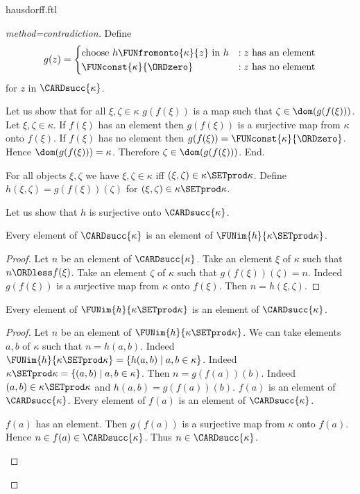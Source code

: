 \documentclass{article}
\begin{document}
\begin{smodule}{hausdorff.ftl}
\begin{forthel}
\begin{proof}[method=contradiction]
    Define \[ g(z) =
      \begin{cases}
        \text{choose $h \FUNfromonto{\kappa}{z}$ in $h$}
        & : \text{$z$ has an element}
        \\
        \text{$\FUNconst{\kappa}{\ORDzero}$}
        & : \text{$z$ has no element}
      \end{cases}
    \] for $z$ in $\CARDsucc{\kappa}$.

    Let us show that for all $\xi, \zeta \in \kappa$ $g(f(\xi))$ is a map such that $\zeta \in \dom(g(f(\xi)))$.
      Let $\xi, \zeta \in \kappa$.
      If $f(\xi)$ has an element then $g(f(\xi))$ is a surjective map from $\kappa$ onto $f(\xi)$.
      If $f(\xi)$ has no element then $g(f(\xi)) = \FUNconst{\kappa}{\ORDzero}$.
      Hence $\dom(g(f(\xi))) = \kappa$.
      Therefore $\zeta \in \dom(g(f(\xi)))$.
    End.

    For all objects $\xi, \zeta$ we have $\xi, \zeta \in \kappa$ iff $(\xi, \zeta) \in \kappa \SETprod \kappa$.
    Define $h(\xi,\zeta) = g(f(\xi))(\zeta)$ for $(\xi,\zeta) \in \kappa \SETprod \kappa$.

    Let us show that $h$ is surjective onto $\CARDsucc{\kappa}$.

      Every element of $\CARDsucc{\kappa}$ is an element of $\FUNim{h}{\kappa \SETprod \kappa}$.
      \begin{proof}
        Let $n$ be an element of $\CARDsucc{\kappa}$.
        Take an element $\xi$ of $\kappa$ such that $n \ORDless f(\xi)$.
        Take an element $\zeta$ of $\kappa$ such that $g(f(\xi))(\zeta) = n$.
        Indeed $g(f(\xi))$ is a surjective map from $\kappa$ onto $f(\xi)$.
        Then $n = h(\xi,\zeta)$.
      \end{proof}

      Every element of $\FUNim{h}{\kappa \SETprod \kappa}$ is an element of $\CARDsucc{\kappa}$.
      \begin{proof}
        Let $n$ be an element of $\FUNim{h}{\kappa \SETprod \kappa}$.
        We can take elements $a, b$ of $\kappa$ such that $n = h(a,b)$.
        Indeed $\FUNim{h}{\kappa \SETprod \kappa} = \{h(a,b) \mid a,b \in \kappa\}$.
        Indeed $\kappa \SETprod \kappa = \{(a,b) \mid a,b \in \kappa\}$.
        Then $n = g(f(a))(b)$.
        Indeed $(a,b) \in \kappa \SETprod \kappa$ and $h(a,b) = g(f(a))(b)$.
        $f(a)$ is an element of $\CARDsucc{\kappa}$.
        Every element of $f(a)$ is an element of $\CARDsucc{\kappa}$.

        \begin{case}{$f(a)$ has an element.}
          Then $g(f(a))$ is a surjective map from $\kappa$ onto $f(a)$.
          Hence $n \in f(a) \in \CARDsucc{\kappa}$.
          Thus $n \in \CARDsucc{\kappa}$.
        \end{case}


\end{proof}
\end{proof}
\end{forthel}
\end{smodule}
\end{document}

